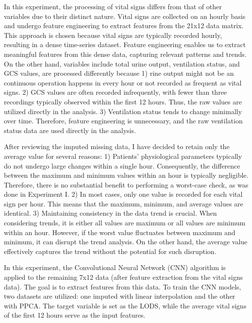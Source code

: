 \documentclass[12pt,a4paper,english
]{tunithesis}
\begin{document}
In this experiment, the processing of vital signs differs from that of other variables due to their distinct nature. Vital signs are collected on an hourly basis and undergo feature engineering to extract features from the 21x12 data matrix. This approach is chosen because vital signs are typically recorded hourly, resulting in a dense time-series dataset. Feature engineering enables us to extract meaningful features from this dense data, capturing relevant patterns and trends. On the other hand, variables include total urine output, ventilation status, and GCS values, are processed differently because 1) rine output might not be an continuous operation happens in every hour or not recorded as frequent as vital signs. 2) GCS values are often recorded infrequently, with fewer than three recordings typically observed within the first 12 hours. Thus, the raw values are utilized directly in the analysis. 3) Ventilation status tends to change minimally over time. Therefore, feature engineering is unnecessary, and the raw ventilation status data are used directly in the analysis.

After reviewing the imputed missing data, I have decided to retain only the average value for several reasons: 1) Patients' physiological parameters typically do not undergo large changes within a single hour. Consequently, the difference between the maximum and minimum values within an hour is typically negligible. Therefore, there is no substantial benefit to performing a worst-case check, as was done in Experiment I. 2) In most cases, only one value is recorded for each vital sign per hour. This means that the maximum, minimum, and average values are identical. 3) Maintaining consistency in the data trend is crucial. When considering trends, it is either all values are maximum or all values are minimum within an hour. However, if the worst value fluctuates between maximum and minimum, it can disrupt the trend analysis. On the other hand, the average value effectively captures the trend without the potential for such disruption. 

In this experiment, the Convolutional Neural Network (CNN) algorithm is applied to the remaining 7x12 data (after feature extraction from the vital signs data). The goal is to extract features from this data. To train the CNN models, two datasets are utilized: one imputed with linear interpolation and the other with PPCA. The target variable is set as the LODS, while the average vital signs of the first 12 hours serve as the input features.
\end{document}
